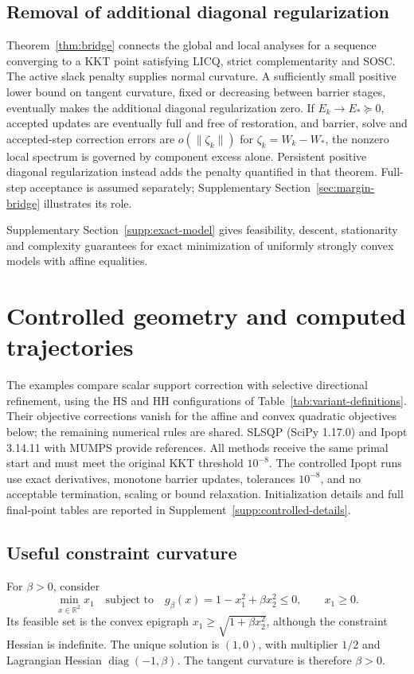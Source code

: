 \documentclass[pdflatex,sn-mathphys-num]{sn-jnl}
\theoremstyle{thmstyleone}
\theoremstyle{thmstylethree}
\begin{document}
\subsection{Removal of additional diagonal regularization}
Theorem~\ref{thm:bridge} connects the global and local analyses for a
sequence converging to a KKT point satisfying LICQ, strict complementarity
and SOSC. The active slack penalty supplies normal curvature. A sufficiently
small positive lower bound on tangent curvature, fixed or decreasing between
barrier stages, eventually makes the additional diagonal regularization zero. If $E_k\to E_*\succeq0$, accepted updates are eventually
full and free of restoration, and barrier, solve and accepted-step
correction errors are $o(\|\zeta_k\|)$ for $\zeta_k=W_k-W_*$,
the nonzero local spectrum
is governed by component excess alone. Persistent positive diagonal regularization
instead adds the penalty quantified in that theorem. Full-step acceptance is assumed separately; Supplementary
Section~\ref{sec:margin-bridge} illustrates its role.

Supplementary Section~\ref{supp:exact-model} gives feasibility, descent,
stationarity and complexity guarantees for exact minimization of uniformly
strongly convex models with affine equalities.

\section{Controlled geometry and computed trajectories}\label{sec:examples}
The examples compare scalar support correction with selective directional
refinement, using the HS and HH configurations of
Table~\ref{tab:variant-definitions}. Their objective corrections vanish
for the affine and convex quadratic objectives below; the remaining
numerical rules are shared. SLSQP (SciPy 1.17.0) and Ipopt 3.14.11 with
MUMPS provide references. All methods receive the same primal start and
must meet the original KKT threshold $10^{-8}$. The controlled Ipopt
runs use exact derivatives, monotone barrier updates, tolerances
$10^{-8}$, and no acceptable termination, scaling or bound relaxation.
Initialization details and full final-point tables are reported in
Supplement~\ref{supp:controlled-details}.

\subsection{Useful constraint curvature}
For $\beta>0$, consider
\begin{equation}\label{eq:favorable-family}
 \min_{x\in\mathbb R^2}x_1\quad\text{subject to}\quad
 g_\beta(x)=1-x_1^2+\beta x_2^2\leq0,\qquad x_1\geq0.
\end{equation}
Its feasible set is the convex epigraph
$x_1\geq\sqrt{1+\beta x_2^2}$, although the constraint Hessian is
indefinite. The unique solution is $(1,0)$, with multiplier $1/2$ and
Lagrangian Hessian $\operatorname{diag}(-1,\beta)$. The tangent
curvature is therefore $\beta>0$.
\end{document}
